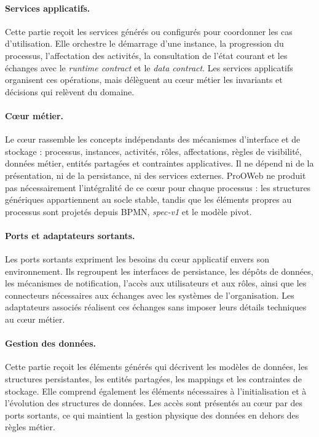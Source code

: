 \paragraph{Services applicatifs.}
Cette partie reçoit les services générés ou configurés pour coordonner les cas
d'utilisation. Elle orchestre le démarrage d'une instance, la progression du
processus, l'affectation des activités, la consultation de l'état courant et les
échanges avec le \textit{runtime contract} et le \textit{data contract}. Les services applicatifs organisent
ces opérations, mais délèguent au cœur métier les invariants et décisions qui
relèvent du domaine.

\paragraph{Cœur métier.}
Le cœur rassemble les concepts indépendants des mécanismes d'interface et de
stockage : processus, instances, activités, rôles, affectations, règles de
visibilité, données métier, entités partagées et contraintes applicatives. Il ne
dépend ni de la présentation, ni de la persistance, ni des services externes.
ProOWeb ne produit pas nécessairement l'intégralité de ce cœur pour chaque
processus : les structures génériques appartiennent au socle stable, tandis que
les éléments propres au processus sont projetés depuis BPMN, \textit{spec-v1} et
le modèle pivot.

\paragraph{Ports et adaptateurs sortants.}
Les ports sortants expriment les besoins du cœur applicatif envers son
environnement. Ils regroupent les interfaces de persistance, les dépôts de
données, les mécanismes de notification, l'accès aux utilisateurs et aux rôles,
ainsi que les connecteurs nécessaires aux échanges avec les systèmes de
l'organisation. Les adaptateurs associés réalisent ces échanges sans imposer
leurs détails techniques au cœur métier.

\paragraph{Gestion des données.}
Cette partie reçoit les éléments générés qui décrivent les modèles de données,
les structures persistantes, les entités partagées, les mappings et les
contraintes de stockage. Elle comprend également les éléments nécessaires à
l'initialisation et à l'évolution des structures de données. Les accès sont
présentés au cœur par des ports sortants, ce qui maintient la gestion physique
des données en dehors des règles métier.

